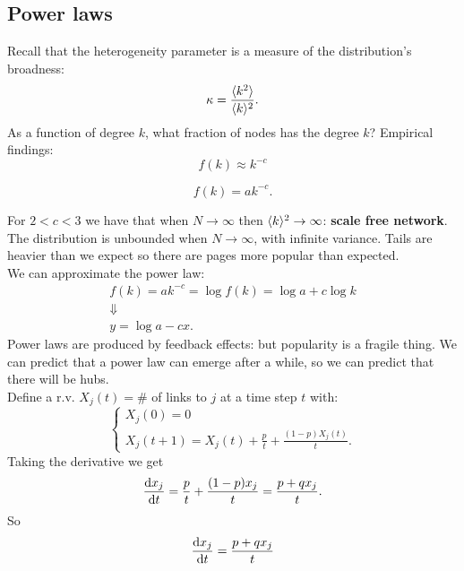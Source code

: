 \documentclass[a4paper,9pt]{extarticle}
\begin{document}
\begin{multicols*}{2}
\section{Power laws}
Recall that the heterogeneity parameter is a measure of the distribution's broadness:
\begin{equation*}
	\kappa=\frac{\langle k^{2} \rangle}{\langle k \rangle^{2}}.
\end{equation*} 
As a function of degree $k$, what fraction of nodes has the degree $k$? Empirical findings:
\begin{equation*}
	f(k)\approx k^{-c}
\end{equation*}
\begin{riquadro}
	\begin{equation*}
		f(k)=ak^{-c}.
	\end{equation*}
\end{riquadro}
For $2<c<3$ we have that when $N\to\infty$ then $\langle k \rangle^{2}\to\infty$: \textbf{scale free network}. The distribution is unbounded when $N\to\infty$, with infinite variance. Tails are heavier than we expect so there are pages more popular than expected. \\
We can approximate the power law:
\begin{equation*}
	\begin{array}{c}
		f(k)=ak^{-c}=\log f(k)=\log a+c\log k\\
		\Downarrow\\
		y=\log a-cx.
	\end{array}
\end{equation*}
Power laws are produced by feedback effects: but popularity is a fragile thing. We can predict that a power law can emerge after a while, so we can predict that there will be hubs.\\
Define a r.v. $X_{j}(t)=\#$ of links to $j$ at a time step $t$ with:
\begin{equation*}
	\begin{cases}
		X_{j}(0)=0\\
		X_{j}(t+1)=X_{j}(t)+\frac{p}{t}+\frac{(1-p)X_{j}(t)}{t}.
	\end{cases}
\end{equation*}
Taking the derivative we get
\begin{equation*}
	\frac{\mathrm{d} x_{j}}{\mathrm{d} t}=\frac{p}{t}+\frac{(1-p)x_{j}}{t}=\frac{p+qx_{j}}{t}.
\end{equation*}
So
\begin{align*}
	&\frac{\dx_{j}}{\dt}=\frac{p+qx_{j}}{t}\\

\end{align*}
\end{multicols*}
\end{document}
